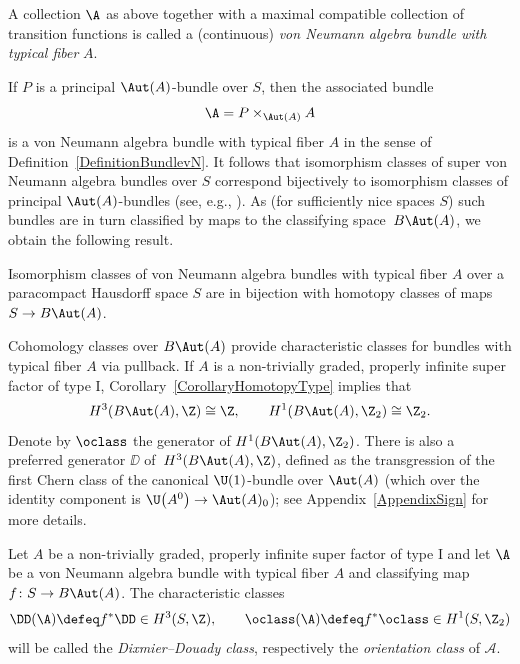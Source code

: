 \begin{Definition} \label{DefinitionBundlevN}
A collection $\A$ as above together with a maximal compatible collection of transition functions is called a (continuous) \emph{von Neumann algebra bundle with typical fiber} $A$.
\end{Definition}

If $P$ is a principal $\Aut(A)$-bundle over $S$, then the associated bundle
\begin{equation*}
\A = P \times_{\Aut(A)} A
\end{equation*}
 is a von Neumann algebra bundle with typical fiber $A$ in the sense of Definition~\ref{DefinitionBundlevN}.
It follows that isomorphism classes of super von Neumann algebra bundles over $S$ %
correspond bijectively to isomorphism classes of principal $\Aut(A)$-bundles (see, e.g., \cite[Section~4]{PennigWStarBundles}).
As (for sufficiently nice spaces $S$) such bundles are in turn classified by maps to the classifying space~$B\Aut(A)$, we obtain the following result.

\begin{Proposition} \label{PropositionClassifyingWStar}
 Isomorphism classes of von Neumann algebra bundles with typical fiber $A$ over a paracompact Hausdorff space $S$ are in bijection with homotopy classes of maps $S \to B\Aut(A)$.
\end{Proposition}

Cohomology classes over $B\Aut(A)$ provide characteristic classes for bundles with typical fiber $A$ via pullback.
If $A$ is a non-trivially graded, properly infinite super factor of type I,
Corollary~\ref{CorollaryHomotopyType} implies that
\begin{equation*}
 H^3(B\Aut(A), \Z) \cong \Z, \qquad H^1(B\Aut(A), \Z_2) \cong \Z_2.
\end{equation*}
Denote by $\oclass$ the generator of $H^1(B\Aut(A), \Z_2)$.
There is also a preferred generator $\DD$ of~$H^3(B\Aut(A), \Z)$, defined as the transgression of the first Chern class of the canonical $\U(1)$-bundle over $\Aut(A)$ (which over the identity component is $\U\big(A^0\big) \to \Aut(A)_0$);
see Appendix~\ref{AppendixSign} for more details.

\begin{Definition} \label{DefinitionCharacteristicClasses}
Let $A$ be a non-trivially graded, properly infinite super factor of type I and let $\A$ be a von Neumann algebra bundle with typical fiber $A$ and classifying map $f\colon S \to B\Aut(A)$.
The characteristic classes
\begin{equation*}
 \DD(\A) \defeq f^* \DD \in H^3(S, \Z), \qquad \oclass(\A) \defeq f^*\oclass \in H^1(S, \Z_2)
\end{equation*}
will be called the \emph{Dixmier--Douady class}, respectively the \emph{orientation class} of $\mathcal{A}$.
\end{Definition}

